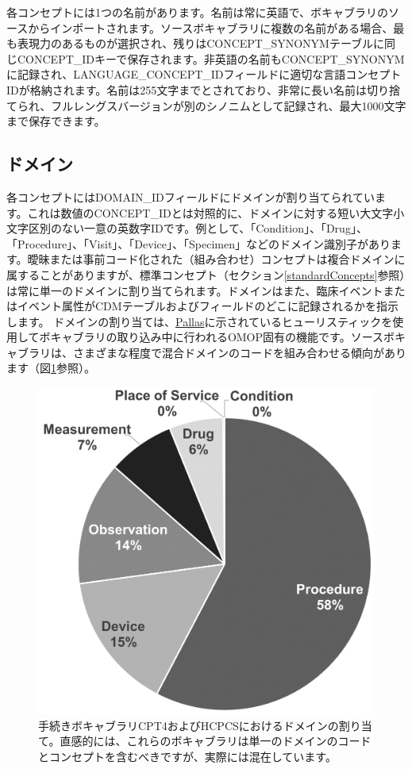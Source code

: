 \documentclass[
  11pt]{book}
\theoremstyle{definition}
\theoremstyle{definition}
\theoremstyle{definition}
\theoremstyle{definition}
\theoremstyle{remark}
\begin{document}
各コンセプトには1つの名前があります。名前は常に英語で、ボキャブラリのソースからインポートされます。ソースボキャブラリに複数の名前がある場合、最も表現力のあるものが選択され、残りはCONCEPT\_SYNONYMテーブルに同じCONCEPT\_IDキーで保存されます。非英語の名前もCONCEPT\_SYNONYMに記録され、LANGUAGE\_CONCEPT\_IDフィールドに適切な言語コンセプトIDが格納されます。名前は255文字までとされており、非常に長い名前は切り捨てられ、フルレングスバージョンが別のシノニムとして記録され、最大1000文字まで保存できます。

\subsection{ドメイン}\label{conceptDomains}

各コンセプトにはDOMAIN\_IDフィールドにドメインが割り当てられています。これは数値のCONCEPT\_IDとは対照的に、ドメインに対する短い大文字小文字区別のない一意の英数字IDです。例として、「Condition」、「Drug」、「Procedure」、「Visit」、「Device」、「Specimen」などのドメイン識別子があります。曖昧または事前コード化された（組み合わせ）コンセプトは複合ドメインに属することがありますが、標準コンセプト（セクション\ref{standardConcepts}参照）は常に単一のドメインに割り当てられます。ドメインはまた、臨床イベントまたはイベント属性がCDMテーブルおよびフィールドのどこに記録されるかを指示します。
ドメインの割り当ては、\href{https://github.com/ohDSI/vocabulary-v5.0}{Pallas}に示されているヒューリスティックを使用してボキャブラリの取り込み中に行われるOMOP固有の機能です。ソースボキャブラリは、さまざまな程度で混合ドメインのコードを組み合わせる傾向があります（図\ref{fig:domains}参照）。

\begin{figure}

{\centering \includegraphics[width=0.7\linewidth]{images/StandardizedVocabularies/domains} 

}

\caption{手続きボキャブラリCPT4およびHCPCSにおけるドメインの割り当て。直感的には、これらのボキャブラリは単一のドメインのコードとコンセプトを含むべきですが、実際には混在しています。}\label{fig:domains}
\end{figure}
\end{document}
